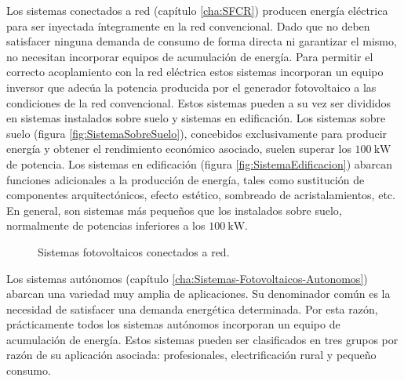Los sistemas conectados a red (capítulo \ref{cha:SFCR}) producen
energía eléctrica para ser inyectada íntegramente en la red convencional.
Dado que no deben satisfacer ninguna demanda de consumo de forma directa
ni garantizar el mismo, no necesitan incorporar equipos de acumulación
de energía. Para permitir el correcto acoplamiento con la red eléctrica
estos sistemas incorporan un equipo inversor que adecúa la potencia
producida por el generador fotovoltaico a las condiciones de la red
convencional. Estos sistemas pueden a su vez ser divididos en sistemas
instalados sobre suelo y sistemas en edificación. Los sistemas sobre
suelo (figura \ref{fig:SistemaSobreSuelo}), concebidos exclusivamente
para producir energía y obtener el rendimiento económico asociado,
suelen superar los $\SI{100}{\kilo\watt}$ de potencia. Los sistemas
en edificación (figura \ref{fig:SistemaEdificacion}) abarcan funciones
adicionales a la producción de energía, tales como sustitución de
componentes arquitectónicos, efecto estético, sombreado de acristalamientos,
etc. En general, son sistemas más pequeños que los instalados sobre
suelo, normalmente de potencias inferiores a los $\SI{100}{\kilo\watt}$.

%
\begin{figure}
\hfill{}\hfill{}\hfill{}

\caption{Sistemas fotovoltaicos conectados a red.}



\end{figure}


Los sistemas autónomos (capítulo \ref{cha:Sistemas-Fotovoltaicos-Autonomos})
abarcan una variedad muy amplia de aplicaciones. Su denominador común
es la necesidad de satisfacer una demanda energética determinada.
Por esta razón, prácticamente todos los sistemas autónomos incorporan
un equipo de acumulación de energía. Estos sistemas pueden ser clasificados
en tres grupos por razón de su aplicación asociada: profesionales,
electrificación rural y pequeño consumo. 

